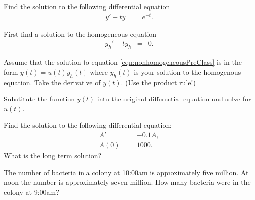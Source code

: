 


\begin{problem}
\item Find the solution to the following differential equation
  \begin{eqnarray}
    \label{eqn:nonhomogeneousPreClass}
    y' + ty & = & e^{-t}.
  \end{eqnarray}

  \begin{subproblem}
  \item First find a solution to the homogeneous equation
  \begin{eqnarray*}
    y_h' + ty_h & = & 0.
  \end{eqnarray*}
    \vfill

  \item Assume that the solution to equation
    \ref{eqn:nonhomogeneousPreClass} is in the form $y(t) = u(t)
    y_h(t)$ where $y_h(t)$ is your solution to the homogenous
    equation. Take the derivative of $y(t)$. (Use the product rule!)
    \vspace{2em}
      
  \item Substitute the function $y(t)$ into the original differential
    equation and solve for $u(t)$.
    \vfill

  \end{subproblem}
\end{problem}


  \begin{problem}
  \item Find the solution to the following differential equation:
    \begin{eqnarray*}
      A' & = & -0.1 A, \\
      A(0) & = & 1000.
    \end{eqnarray*}
    What is the long term solution?
    \vfill
    \clearpage
  \item The number of bacteria in a colony at 10:00am is approximately
    five million. At noon the number is approximately seven
    million. How many bacteria were in the colony at 9:00am?
    \vfill
  \end{problem}



